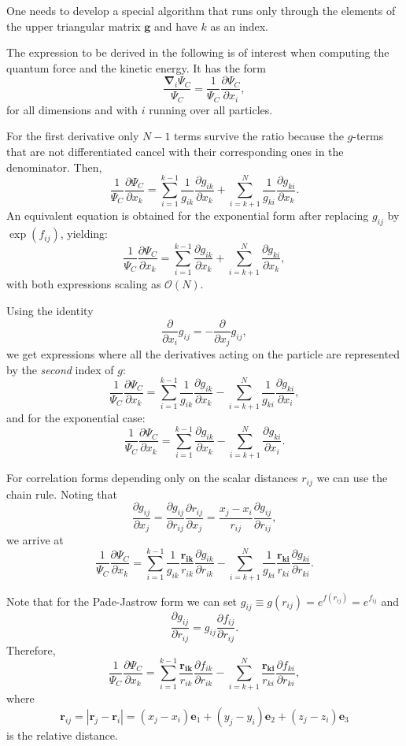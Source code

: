 \documentclass[%
oneside,                 %
final,                   %
10pt]{article}
\begin{document}
One needs to develop a special algorithm 
that runs only through the elements of the upper triangular
matrix $\mathbf{g}$ and have $k$ as an index. 

The expression to be derived in the following is of interest when computing the quantum force and the kinetic energy. It has the form
\[
\frac{\mathbf{\nabla}_i\Psi_C}{\Psi_C} = \frac{1}{\Psi_C}\frac{\partial \Psi_C}{\partial x_i},
\]
for all dimensions and with $i$ running over all particles.

For the first derivative only $N-1$ terms survive the ratio because the $g$-terms that are not differentiated cancel with their corresponding ones in the denominator. Then,
\[
\frac{1}{\Psi_C}\frac{\partial \Psi_C}{\partial x_k} =
\sum_{i=1}^{k-1}\frac{1}{g_{ik}}\frac{\partial g_{ik}}{\partial x_k}
+
\sum_{i=k+1}^{N}\frac{1}{g_{ki}}\frac{\partial g_{ki}}{\partial x_k}.
\]
An equivalent equation is obtained for the exponential form after replacing $g_{ij}$ by $\exp(f_{ij})$, yielding:
\[
\frac{1}{\Psi_C}\frac{\partial \Psi_C}{\partial x_k} =
\sum_{i=1}^{k-1}\frac{\partial g_{ik}}{\partial x_k}
+
\sum_{i=k+1}^{N}\frac{\partial g_{ki}}{\partial x_k},
\]
with both expressions scaling as $\mathcal{O}(N)$.

Using the identity 
\[
\frac{\partial}{\partial x_i}g_{ij} = -\frac{\partial}{\partial x_j}g_{ij},
\]
we get expressions where all the derivatives acting on the particle  are represented by the \emph{second} index of $g$:
\[
\frac{1}{\Psi_C}\frac{\partial \Psi_C}{\partial x_k} =
\sum_{i=1}^{k-1}\frac{1}{g_{ik}}\frac{\partial g_{ik}}{\partial x_k}
-\sum_{i=k+1}^{N}\frac{1}{g_{ki}}\frac{\partial g_{ki}}{\partial x_i},
\]
and for the exponential case:
\[
\frac{1}{\Psi_C}\frac{\partial \Psi_C}{\partial x_k} =
\sum_{i=1}^{k-1}\frac{\partial g_{ik}}{\partial x_k}
-\sum_{i=k+1}^{N}\frac{\partial g_{ki}}{\partial x_i}.
\]

For correlation forms depending only on the scalar distances $r_{ij}$ we can use the chain rule. Noting that 
\[
\frac{\partial g_{ij}}{\partial x_j} = \frac{\partial g_{ij}}{\partial r_{ij}} \frac{\partial r_{ij}}{\partial x_j} = \frac{x_j - x_i}{r_{ij}} \frac{\partial g_{ij}}{\partial r_{ij}},
\]
we arrive at
\[
\frac{1}{\Psi_C}\frac{\partial \Psi_C}{\partial x_k} = 
\sum_{i=1}^{k-1}\frac{1}{g_{ik}} \frac{\mathbf{r_{ik}}}{r_{ik}} \frac{\partial g_{ik}}{\partial r_{ik}}
-\sum_{i=k+1}^{N}\frac{1}{g_{ki}}\frac{\mathbf{r_{ki}}}{r_{ki}}\frac{\partial g_{ki}}{\partial r_{ki}}.
\]

Note that for the Pade-Jastrow form we can set $g_{ij} \equiv g(r_{ij}) = e^{f(r_{ij})} = e^{f_{ij}}$ and 
\[
\frac{\partial g_{ij}}{\partial r_{ij}} = g_{ij} \frac{\partial f_{ij}}{\partial r_{ij}}.
\]
Therefore, 
\[
\frac{1}{\Psi_{C}}\frac{\partial \Psi_{C}}{\partial x_k} =
\sum_{i=1}^{k-1}\frac{\mathbf{r_{ik}}}{r_{ik}}\frac{\partial f_{ik}}{\partial r_{ik}}
-\sum_{i=k+1}^{N}\frac{\mathbf{r_{ki}}}{r_{ki}}\frac{\partial f_{ki}}{\partial r_{ki}},
\]
where 
\[
 \mathbf{r}_{ij} = |\mathbf{r}_j - \mathbf{r}_i| = (x_j - x_i)\mathbf{e}_1 + (y_j - y_i)\mathbf{e}_2 + (z_j - z_i)\mathbf{e}_3
\]
is the relative distance. 
\end{document}
